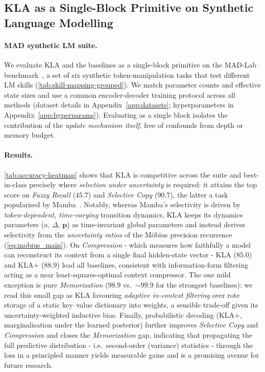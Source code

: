 \documentclass{article}
\begin{document}
\subsection{\textsc{KLA} as a Single-Block Primitive on Synthetic Language Modelling}
\label{sec:synthetic-lm}

\paragraph{MAD synthetic LM suite.}
We evaluate \textsc{KLA} and the baselines as a single-block primitive on the MAD-Lab benchmark~\citep{poli2024mad}, a set of six synthetic token-manipulation tasks that test different LM skills (\cref{tab:skill-mapping-grouped}). We match parameter counts and effective state sizes and use a common encoder-decoder training protocol across all methods (dataset details in Appendix~\ref{app:datasets}; hyperparameters in Appendix~\ref{app:hyperparams}). Evaluating as a single block isolates the contribution of the \emph{update mechanism itself}, free of confounds from depth or memory budget.

\paragraph{Results.}
\cref{tab:accuracy-heatmap} shows that \textsc{KLA} is competitive across the suite and best-in-class precisely where \emph{selection under uncertainty} is required: it attains the top score on \textit{Fuzzy Recall} ($45.7$) and \textit{Selective Copy} ($90.7$), the latter a task popularised by Mamba~\citep{gu2023mamba}. Notably, whereas Mamba's selectivity is driven by \emph{token-dependent, time-varying} transition dynamics, \textsc{KLA} keeps its dynamics parameters ($a$, $\Delta$, $\mathbf{p}$) as time-invariant global parameters and instead derives selectivity from the \emph{uncertainty ratios} of the M\"{o}bius precision recurrence (\cref{eq:mobius_main}).
On \textit{Compression} - which measures how faithfully a model can reconstruct its context from a single final hidden-state vector - \textsc{KLA} ($85.0$) and \textsc{KLA}+ ($88.9$) lead all baselines, consistent with information-form filtering acting as a near least-squares-optimal context compressor.
The one mild exception is pure \textit{Memorization} ($98.9$ vs.\ ${\sim}99.9$ for the strongest baselines): we read this small gap as \textsc{KLA} favouring \emph{adaptive in-context filtering} over rote storage of a static key--value dictionary into weights, a sensible trade-off given its uncertainty-weighted inductive bias.
Finally, probabilistic decoding (\textsc{KLA}+, marginalisation under the learned posterior) further improves \textit{Selective Copy} and \textit{Compression} and closes the \textit{Memorization} gap, indicating that propagating the full predictive distribution - i.e.\ second-order (variance) statistics - through the loss in a principled manner yields measurable gains and is a promising avenue for future research.
\end{document}
